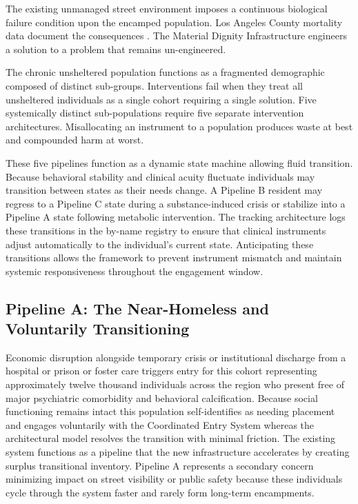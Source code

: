 \documentclass[12pt, letterpaper]{article}
\begin{document}
The existing unmanaged street environment imposes a continuous biological failure condition upon the encamped population. Los Angeles County mortality data document the consequences \citep{la_mortality_2026}. The Material Dignity Infrastructure engineers a solution to a problem that remains un-engineered.

The chronic unsheltered population functions as a fragmented demographic composed of distinct sub-groups. Interventions fail when they treat all unsheltered individuals as a single cohort requiring a single solution. Five systemically distinct sub-populations require five separate intervention architectures. Misallocating an instrument to a population produces waste at best and compounded harm at worst.

These five pipelines function as a dynamic state machine allowing fluid transition. Because behavioral stability and clinical acuity fluctuate individuals may transition between states as their needs change. A Pipeline B resident may regress to a Pipeline C state during a substance-induced crisis or stabilize into a Pipeline A state following metabolic intervention. The tracking architecture logs these transitions in the by-name registry to ensure that clinical instruments adjust automatically to the individual's current state. Anticipating these transitions allows the framework to prevent instrument mismatch and maintain systemic responsiveness throughout the engagement window.

\subsection{Pipeline A: The Near-Homeless and Voluntarily Transitioning}

Economic disruption alongside temporary crisis or institutional discharge from a hospital or prison or foster care triggers entry for this cohort representing approximately twelve thousand individuals across the region who present free of major psychiatric comorbidity and behavioral calcification. Because social functioning remains intact this population self-identifies as needing placement and engages voluntarily with the Coordinated Entry System whereas the architectural model resolves the transition with minimal friction. The existing system functions as a pipeline that the new infrastructure accelerates by creating surplus transitional inventory. Pipeline A represents a secondary concern minimizing impact on street visibility or public safety because these individuals cycle through the system faster and rarely form long-term encampments.
\end{document}
